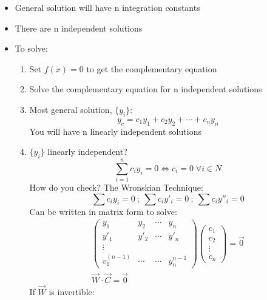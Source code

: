 \documentclass[Maths.tex]{subfiles}
\begin{document}
\begin{itemize}
    \item General solution will have n integration constants
    \item There are n independent solutions
    \item To solve:
    \begin{enumerate}
        \item Set $f(x) = 0$ to get the complementary equation
        \item Solve the complementary equation for n independent solutions
        \item Most general solution, $\{y_i\}$:
            \begin{equation*}
                y_c = c_1y_1 + c_2y_2 + \cdots + c_ny_n
            \end{equation*}
            You will have n linearly independent solutions
        \item $\{y_i\}$ linearly independent?
            \begin{equation*}
                \sum_{i = 1}^{n}c_iy_i = 0 \iff c_i = 0 \;\forall i \in N
            \end{equation*}
            How do you check? The Wronskian Technique:
            \begin{equation*}
                \sum c_iy_i = 0 ~;~ \sum c_iy'_i = 0 ~;~ \sum c_iy''_i = 0
            \end{equation*}
            Can be written in matrix form to solve:
            \begin{align*}
                \begin{pmatrix}
                    y_1 & y_2 & \cdots & y_n \\
                    y'_1 & y'_2 & \cdots & y'_n \\
                    \vdots & & & \\
                    v^{(n - 1)}_{1} & \cdots & \cdots & y^{n - 1}_{n}
                \end{pmatrix}
                \begin{pmatrix}
                    c_1 \\
                    c_2 \\
                    \vdots \\
                    c_n
                \end{pmatrix} = \vec{0} \\ \vec{W} \cdot \vec{C} = \vec{0}
            \end{align*}
            If $\vec{W}$ is invertible:

\end{enumerate}
\end{itemize}
\end{document}
